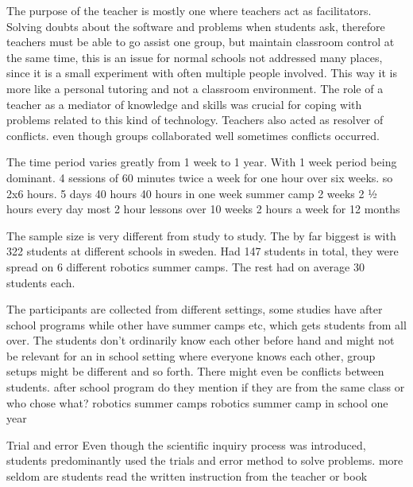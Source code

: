 \bigskip\noindent
The purpose of the teacher is mostly one where teachers act as facilitators. Solving doubts about the software and problems when students ask, therefore teachers must be able to go assist one group, but maintain classroom control at the same time, this is an issue for normal schools not addressed many places, since it is a small experiment with often multiple people involved. This way it is more like a personal tutoring and not a classroom environment. 
\cite{lindh2007does} The role of a teacher as a mediator of knowledge and skills was crucial for coping with problems related to this kind of technology. 
\cite{lindh2007does} Teachers also acted as resolver of conflicts. even though groups collaborated well sometimes conflicts occurred. 

\bigskip\noindent
The time period varies greatly from 1 week to 1 year. With 1 week period being dominant.
\cite{mitnik2009collaborative} 4 sessions of 60 minutes
\cite{barker2007robotics} twice a week for one hour over six weeks. so 2x6 hours. 
\cite{nugent2008effect} 5 days 40 hours
\cite{nugent2009use} 40 hours in one week summer camp
\cite{williams2007acquisition} 2 weeks 2 ½ hours every day
\cite{norton2004using} most 2 hour lessons over 10 weeks
\cite{lindh2007does} 2 hours a week for 12 months

\bigskip\noindent
The sample size is very different from study to study. The by far biggest is \cite{lindh2007does} with 322 students at different schools in sweden. \cite{nugent2009use} Had 147 students in total, they were spread on 6 different robotics summer camps. The rest had on average 30 students each.

\bigskip\noindent
The participants are collected from different settings, some studies have after school programs while other have summer camps etc, which gets students from all over. The students don’t ordinarily know each other before hand and might not be relevant for an in school setting where everyone knows each other, group setups might be different and so forth. There might even be conflicts between students.
\cite{barker2007robotics} after school program do they mention if they are from the same class or who chose what?
\cite{nugent2009use} robotics summer camps
\cite{williams2007acquisition} robotics summer camp
\cite{lindh2007does} in school one year

\bigskip\noindent
Trial and error 
\cite{williams2007acquisition} Even though the scientific inquiry process was introduced, students predominantly used the trials and error method to solve problems. 
\cite{lindh2007does}more seldom are students read the written instruction from the teacher or book


